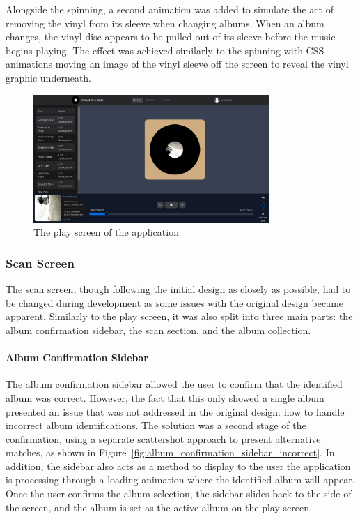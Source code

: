 Alongside the spinning, a second animation was added to simulate the act of removing the vinyl from its sleeve when changing albums. When an album changes, the vinyl disc appears to be pulled out of its sleeve before the music begins playing. The effect was achieved similarly to the spinning with CSS animations moving an image of the vinyl sleeve off the screen to reveal the vinyl graphic underneath.

\begin{figure} [H]
    \centering
    \includegraphics[width=0.8\textwidth]{figures/play_screen.png}
    \caption{The play screen of the application}
    \label{fig:play_screen}
\end{figure}

\subsubsection{Scan Screen}
The scan screen, though following the initial design as closely as possible, had to be changed during development as some issues with the original design became apparent. Similarly to the play screen, it was also split into three main parts: the album confirmation sidebar, the scan section, and the album collection.

\paragraph{Album Confirmation Sidebar}
The album confirmation sidebar allowed the user to confirm that the identified album was correct. However, the fact that this only showed a single album presented an issue that was not addressed in the original design: how to handle incorrect album identifications. The solution was a second stage of the confirmation, using a separate scattershot approach to present alternative matches, as shown in Figure~\ref{fig:album_confirmation_sidebar_incorrect}. In addition, the sidebar also acts as a method to display to the user the application is processing through a loading animation where the identified album will appear. Once the user confirms the album selection, the sidebar slides back to the side of the screen, and the album is set as the active album on the play screen.

